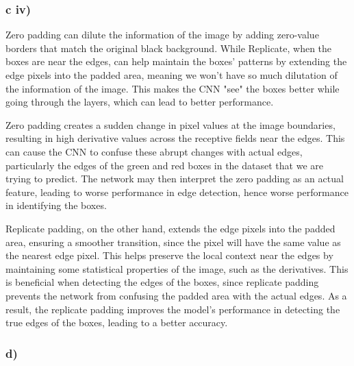 \documentclass{article}
\begin{document}
\subsubsection*{c iv)}

Zero padding can dilute the information of the image by adding zero-value borders that match the original black background.
While Replicate, when the boxes are near the edges, can help maintain the boxes' patterns by extending the edge pixels into the padded area,
meaning we won't have so much dilutation of the information of the image. This makes the CNN "see" the boxes better while going
through the layers, which can lead to better performance.

Zero padding creates a sudden change in pixel values at the image boundaries, resulting in high derivative values across
the receptive fields near the edges. This can cause the CNN to confuse these abrupt changes with actual edges,
particularly the edges of the green and red boxes in the dataset that we are trying to predict.
The network may then interpret the zero padding as an actual feature, leading to worse performance in
edge detection, hence worse performance in identifying the boxes.

Replicate padding, on the other hand, extends the edge pixels into the padded area, ensuring a smoother transition, since
the pixel will have the same value as the nearest edge pixel. This helps preserve the local context near the edges by maintaining
some statistical properties of the image, such as the derivatives. This is beneficial
when detecting the edges of the boxes, since replicate padding prevents the network from confusing the padded area with the actual
edges. As a result, the replicate padding improves the model's performance in detecting the true edges of the boxes, leading
to a better accuracy.



\subsubsection*{d)}
\end{document}
